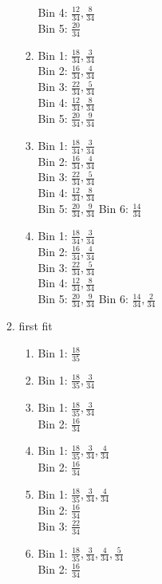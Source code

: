\documentclass[11pt]{article}
\begin{document}
\begin{enumerate}
\begin{enumerate}
\begin{enumerate}
Bin 4: $\frac{12}{34}, \frac{8}{34}$\\
Bin 5: $\frac{20}{34}$
\item Bin 1: $\frac{18}{34}, \frac{3}{34}$\\
Bin 2: $\frac{16}{34}, \frac{4}{34}$\\
Bin 3: $\frac{22}{34}, \frac{5}{34}$\\
Bin 4: $\frac{12}{34}, \frac{8}{34}$\\
Bin 5: $\frac{20}{34}, \frac{9}{34}$
\item Bin 1: $\frac{18}{34}, \frac{3}{34}$\\
Bin 2: $\frac{16}{34}, \frac{4}{34}$\\
Bin 3: $\frac{22}{34}, \frac{5}{34}$\\
Bin 4: $\frac{12}{34}, \frac{8}{34}$\\
Bin 5: $\frac{20}{34}, \frac{9}{34}$
Bin 6: $\frac{14}{34}$
\item Bin 1: $\frac{18}{34}, \frac{3}{34}$\\
Bin 2: $\frac{16}{34}, \frac{4}{34}$\\
Bin 3: $\frac{22}{34}, \frac{5}{34}$\\
Bin 4: $\frac{12}{34}, \frac{8}{34}$\\
Bin 5: $\frac{20}{34}, \frac{9}{34}$
Bin 6: $\frac{14}{34}, \frac{2}{34}$
\end{enumerate}
\item first fit
\begin{enumerate}
\item Bin 1: $\frac{18}{35}$\\
\item Bin 1: $\frac{18}{35}, \frac{3}{34}$\\
\item Bin 1: $\frac{18}{35}, \frac{3}{34}$\\
Bin 2: $\frac{16}{34}$\\
\item Bin 1: $\frac{18}{35}, \frac{3}{34}, \frac{4}{34}$\\
Bin 2: $\frac{16}{34}$\\
\item Bin 1: $\frac{18}{35}, \frac{3}{34}, \frac{4}{34}$\\
Bin 2: $\frac{16}{34}$\\
Bin 3: $\frac{22}{34}$\\
\item Bin 1: $\frac{18}{35}, \frac{3}{34}, \frac{4}{34}, \frac{5}{34}$\\
Bin 2: $\frac{16}{34}$\\

\end{enumerate}
\end{enumerate}
\end{enumerate}
\end{document}
